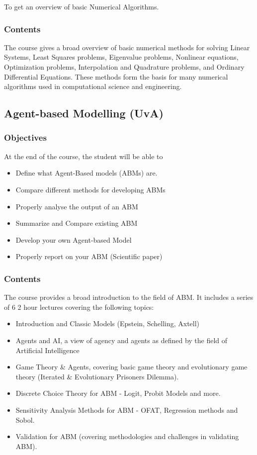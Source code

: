 \documentclass[11pt]{article}
\begin{document}
To get an overview of basic Numerical Algorithms.

\subsubsection{Contents}
\label{sec:org420183f}

The course gives a broad overview of basic numerical methods for solving Linear
Systems, Least Squares problems, Eigenvalue problems, Nonlinear equations,
Optimization problems, Interpolation and Quadrature problems, and Ordinary
Differential Equations. These methods form the basis for many numerical
algorithms used in computational science and engineering.

\subsection{Agent-based Modelling (UvA)}
\label{sec:orge514ab6}

\subsubsection{Objectives}
\label{sec:org777be03}

At the end of the course, the student will be able to

\begin{itemize}
\item Define what Agent-Based models (ABMs) are.
\item Compare different methods for developing ABMs
\item Properly analyse the output of an ABM
\item Summarize and Compare existing ABM
\item Develop your own Agent-based Model
\item Properly report on your ABM (Scientific paper)
\end{itemize}

\subsubsection{Contents}
\label{sec:org0557935}

The course provides a broad introduction to the field of ABM. It includes a
series of 6 2 hour lectures covering the following topics:

\begin{itemize}
\item Introduction and Classic Models (Epstein, Schelling, Axtell)
\item Agents and AI, a view of agency and agents as defined by the field of
Artificial Intelligence
\item Game Theory \& Agents, covering basic game theory and evolutionary game theory
(Iterated \& Evolutionary Prisoners Dilemma).
\item Discrete Choice Theory for ABM - Logit, Probit Models and more.
\item Sensitivity Analysis Methods for ABM - OFAT, Regression methods and Sobol.
\item Validation for ABM (covering methodologies and challenges in validating ABM).
\end{itemize}
\end{document}
